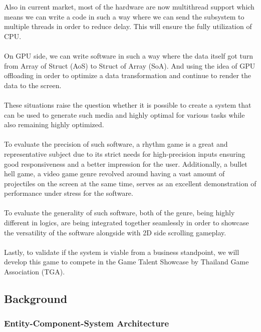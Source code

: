 Also in current market, most of the hardware are now multithread support which means we can write a code in such a
way where we can send the subsystem to multiple threads in order to reduce delay.
This will ensure the fully utilization of CPU\@.
\\\\
On GPU side, we can write software in such a way where the data itself got turn from Array of Struct (AoS) to Struct of Array (SoA).
And using the idea of GPU offloading in order to optimize a data transformation and continue to render the data to the screen.
\\\\
These situations raise the question \textemdash whether it is possible to create a system that can be used to generate such media
and highly optimal for various tasks while also remaining highly optimized.
\\\\
To evaluate the precision of such software, a rhythm game is a great and representative subject
due to its strict needs for high-precision inputs ensuring good responsiveness and a better impression for the user.
Additionally, a bullet hell game, a video game genre revolved around having a vast amount of projectiles on the screen at the same time,
serves as an excellent demonstration of performance under stress for the software.
\\\\
To evaluate the generality of such software, both of the genre, being highly different in logics, are being integrated together seamlessly
in order to showcase the versatility of the software alongside with 2D side scrolling gameplay.
\\\\
Lastly, to validate if the system is viable from a business standpoint, we will develop this game
to compete in the Game Talent Showcase by Thailand Game Association (TGA).

\subsection{Background}
\label{subsec:background}

\subsubsection*{Entity-Component-System Architecture}

